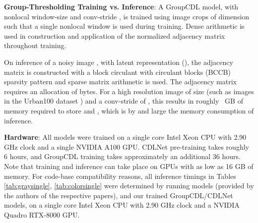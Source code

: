\documentclass[lettersize,journal]{IEEEtran}
\begin{document}
\textbf{Group-Thresholding Training vs. Inference}:
A GroupCDL model, with nonlocal window-size  and conv-stride , is
trained using image crops of dimension  such that a
single nonlocal window is used during training. Dense arithmetic is used in
construction and application of the normalized adjacency matrix 
throughout training.

On inference of a noisy image , with latent representation
 (), the adjacency matrix  is constructed with a block circulant with circulant blocks (BCCB) sparsity
pattern and sparse matrix arithmetic is used.
The adjacency matrix requires an allocation of 
 bytes. 
For a high resolution image of size  (such as images in the
Urban100 dataset \cite{Urban100}) and a conv-stride of , this
results in roughly {~GB} of memory required to store  and
, which is by and large the memory consumption of inference.

\textbf{Hardware}:
All models were trained on a single core Intel Xeon CPU with 2.90 GHz clock and a single NVIDIA A100 GPU.
CDLNet pre-training takes roughly 6 hours, and GroupCDL training takes
approximately an additional 36 hours. Note that training and inference can take place on GPUs
with as low as 16 GB of memory. For code-base compatibility reasons, all inference timings in Tables
\ref{tab:graysingle}, \ref{tab:colorsingle} 
were determined by running models (provided by the authors of the respective papers), and our trained GroupCDL/CDLNet models, on
a single core Intel Xeon CPU with 2.90 GHz clock and a NVIDIA Quadro RTX-8000
GPU.
\end{document}
